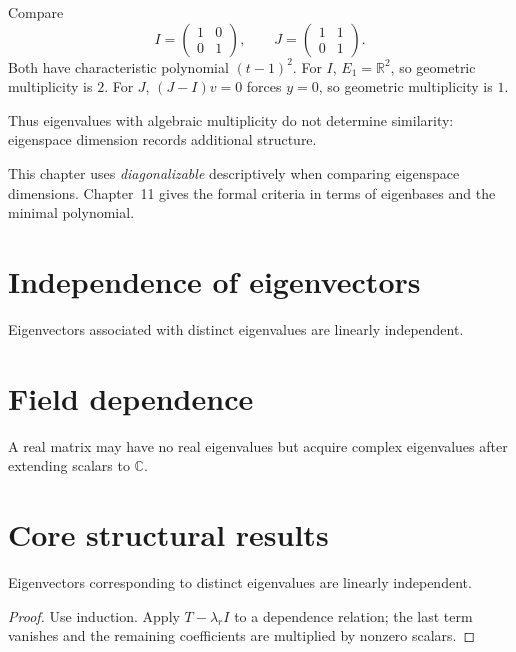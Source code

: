 \begin{example}\label{ex:i09-expand-03}
Compare
\[
I=\begin{pmatrix}1&0\\0&1\end{pmatrix},
\qquad
J=\begin{pmatrix}1&1\\0&1\end{pmatrix}.
\]
Both have characteristic polynomial \((t-1)^2\). For \(I\),
\(E_1=\mathbb R^2\), so geometric multiplicity is \(2\). For \(J\),
\((J-I)v=0\) forces \(y=0\), so geometric multiplicity is \(1\).

Thus eigenvalues with algebraic multiplicity do not determine similarity:
eigenspace dimension records additional structure.
\end{example}
\begin{remark}
This chapter uses \emph{diagonalizable} descriptively when comparing eigenspace
dimensions. Chapter~11 gives the formal criteria in terms of eigenbases and the
minimal polynomial.
\end{remark}

\section{Independence of eigenvectors}
Eigenvectors associated with distinct eigenvalues are linearly independent.

\section{Field dependence}
A real matrix may have no real eigenvalues but acquire complex eigenvalues after extending scalars to $\mathbb C$.

\section{Core structural results}

\begin{theorem}\label{thm:i09-01}
Eigenvectors corresponding to distinct eigenvalues are linearly independent.
\begin{proof}
Use induction. Apply $T-\lambda_r I$ to a dependence relation; the last term vanishes and the remaining coefficients are multiplied by nonzero scalars.
\end{proof}
\end{theorem}

